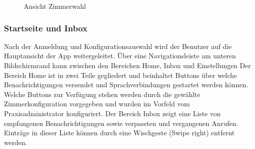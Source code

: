 \begin{figure}[h]
\begin{minipage}[b]{0.4\textwidth}
        \caption{Ansicht Zimmerwahl }
    \end{minipage}

    \label{fig:MobileClient-Screens1}

\end{figure}

\clearpage

\subsubsection{Startseite und Inbox}

Nach der Anmeldung und Konfigurationsauswahl wird der Benutzer auf die Hauptansicht der App weitergeleitet.
Über eine Navigationsleiste am unteren Bildschirmrand kann zwischen den Bereichen Home, Inbox und Einstellungen
Der Bereich Home ist in zwei Teile gegliedert und beinhaltet Buttons über welche Benachrichtigungen versendet und Sprachverbindungen gestartet werden können.
Welche Buttons zur Verfügung stehen werden durch die gewählte Zimmerkonfiguration vorgegeben und wurden im Vorfeld vom Praxisadministrator konfiguriert.
Der Bereich Inbox zeigt eine Liste von empfangenen Benachrichtigungen sowie verpassten und vergangenen Anrufen.
Einträge in dieser Liste können durch eine Wischgeste (Swipe right) entfernt werden.


